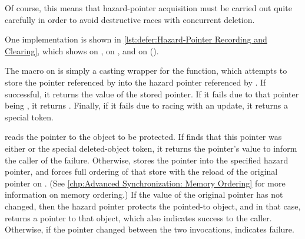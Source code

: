Of course, this means that hazard-pointer acquisition must be carried
out quite carefully in order to avoid destructive races with concurrent
deletion.
\begin{fcvref}
One implementation is shown in
\cref{lst:defer:Hazard-Pointer Recording and Clearing},
which shows  on ,
 on , and
 on
 ().

The  macro on  is simply a casting
wrapper for the  function, which attempts to store
the pointer referenced by  into the hazard pointer referenced
by .
If successful, it returns the value of the stored pointer.
If it fails due to that pointer being , it returns .
Finally, if it fails due to racing with an update, it returns a special
 token.

\QuickQuizEnd

 reads the pointer to the object to be protected.
If  finds that this pointer was either  or
the special  deleted-object token, it returns
the pointer's value to inform the caller of the failure.
Otherwise,  stores the pointer into the specified
hazard pointer, and  forces full ordering of that
store with the reload of the original pointer on .
(See \cref{chp:Advanced Synchronization: Memory Ordering}
for more information on memory ordering.)
If the value of the original pointer has not changed, then the hazard
pointer protects the pointed-to object, and in that case,
 returns a pointer to that object, which also
indicates success to the caller.
Otherwise, if the pointer changed between the two 
invocations,  indicates failure.


\end{fcvref}
